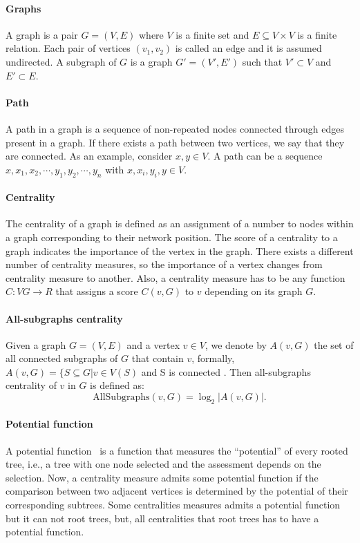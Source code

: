 

\paragraph{Graphs} A graph is a pair $G = (V, E)$ where $V$ is a finite set and $E \subseteq V\times V$ is a finite relation. Each pair of vertices $(v_{1},v_{2})$ is called an edge and it is assumed undirected. A subgraph of $G$ is a graph $G'=(V', E')$ such that $V' \subset V$ and $E' \subset E$.

\paragraph{Path} A path in a graph is a sequence of non-repeated nodes connected through edges present in a graph. If there exists a path between two vertices, we say that they are connected. As an example, consider $x,y \in V$. A path can be a sequence $x,x_{1},x_{2},\cdots,y_{1},y_{2},\cdots,y_{n}$ with $x,x_{i},y_{i},y \in V$.


\paragraph{Centrality} The centrality of a graph is defined as an assignment of a number to nodes within a graph corresponding to their network position. The score of a centrality to a graph indicates the importance of the vertex in the graph. There exists a different number of centrality measures, so the importance of a vertex changes from centrality measure to another. Also, a centrality measure has to be any function $C : VG \rightarrow R$ that assigns a score $C(v, G)$ to $v$ depending on its graph $G$. 

\paragraph{All-subgraphs centrality} Given a graph $G = (V, E)$ and a vertex $v \in V$, we denote by $A(v, G)$ the set of all connected subgraphs of $G$ that contain $v$, formally, $A(v, G) = \{S \subseteq G | v \in V (S)$ and S is connected \cite{RiverosS20}. Then all-subgraphs centrality of $v$ in $G$ is defined
as: 
$$
\text{AllSubgraphs}(v, G) = \log_{2}{|A(v, G)|}.
$$

\paragraph{Potential function} A potential function~\cite{RiverosSS23} is a function that measures the “potential” of every rooted tree, i.e.,
a tree with one node selected and the assessment depends on the selection. Now, a centrality measure admits some potential function if the comparison between two adjacent vertices is determined by the potential of their corresponding subtrees. Some centralities measures admits a potential function but it can not root trees, but, all centralities that root trees has to have a potential function.

